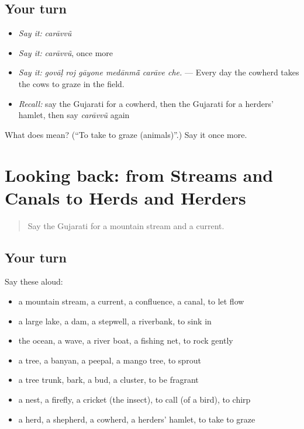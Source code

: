 \subsection*{Your turn}
\begin{itemize}
\raggedright
  \item \emph{Say it:} \emph{carāvvũ}
  \item \emph{Say it:} \emph{carāvvũ}, once more
  \item \emph{Say it:} \emph{govāḷ roj gāyone medānmā̃ carāve che.} — Every day the cowherd takes the cows to graze in the field.
  \item \emph{Recall:} say the Gujarati for a cowherd, then the Gujarati for a herders' hamlet, then say \emph{carāvvũ} again
\end{itemize}

\begin{tcolorbox}[breakable,colback=teal!4,colframe=teal!35!black,title={Before you move on}]
What does  mean? (\textquotedblleft{}To take to graze (animals)\textquotedblright{}.) Say it once more.
\end{tcolorbox}
\section[(dialogue)]{Looking back: from Streams and Canals to Herds and Herders}

\label{lesson:GU-R446-review-440-446}



\begin{quote}
Say the Gujarati for a mountain stream and a current.
\end{quote}

\subsection*{Your turn}
Say these aloud:

\begin{itemize}
\raggedright
  \item a mountain stream, a current, a confluence, a canal, to let flow
  \item a large lake, a dam, a stepwell, a riverbank, to sink in
  \item the ocean, a wave, a river boat, a fishing net, to rock gently
  \item a tree, a banyan, a peepal, a mango tree, to sprout
  \item a tree trunk, bark, a bud, a cluster, to be fragrant
  \item a nest, a firefly, a cricket (the insect), to call (of a bird), to chirp
  \item a herd, a shepherd, a cowherd, a herders' hamlet, to take to graze
\end{itemize}

